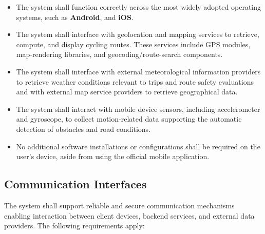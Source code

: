 \begin{itemize}
    \item The system shall function correctly across the most widely adopted operating systems, such as \textbf{Android}, and \textbf{iOS}.
    
    \item The system shall interface with geolocation and mapping services to retrieve, compute, and display cycling routes. These services include GPS modules, map-rendering libraries, and geocoding/route-search components.
    
    \item The system shall interface with external meteorological information providers to retrieve weather conditions relevant to trips and route safety evaluations and with external map service providers to retrieve geographical data.
    
    \item The system shall interact with mobile device sensors, including accelerometer and gyroscope, to collect motion-related data supporting the automatic detection of obstacles and road conditions.
    
    \item No additional software installations or configurations shall be required on the user's device, aside from using the official mobile application.
\end{itemize}

\subsection{Communication Interfaces}

The system shall support reliable and secure communication mechanisms enabling interaction between client devices, backend services, and external data providers. The following requirements apply:

